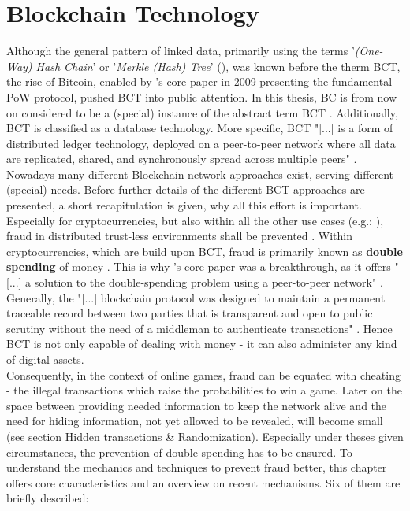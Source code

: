 
\chapter{Blockchain Technology}
\label{chap:BCT}

Although the general pattern of linked data,
primarily using the terms '\textit{(One-Way) Hash Chain}' or '\textit{Merkle (Hash) Tree}' (\citet{Hu.2005}),
was known before the therm \gls{BCT}, the rise of Bitcoin,
enabled by \citeauthor{Nakamoto.2009}'s core paper in 2009 presenting the fundamental \gls{PoW} protocol, pushed \gls{BCT} into public attention.
In this thesis, \gls{BC} is from now on considered to be a (special) instance of the abstract term \gls{BCT} \label{sec:BCI}.
Additionally, \gls{BCT} is classified as a database technology.
More specific, \gls{BCT} "[...] is a form of distributed ledger technology, deployed on a peer-to-peer network where all data are replicated, shared, and synchronously spread across multiple peers" \cite[13]{Butijn.2020}.
Nowadays many different Blockchain network approaches exist, serving different (special) needs.
Before further details of the different \gls{BCT} approaches are presented, a short recapitulation is given, why all this effort is important. \\
Especially for cryptocurrencies, but also within all the other use cases (e.g.: \cite{Serada.2020}),
fraud in distributed trust-less environments shall be prevented \cite[1]{Xu.2019}.
Within cryptocurrencies, which are build upon \gls{BCT}, fraud is primarily known as \textbf{double spending} of money \cite[1]{Nakamoto.2009}.
This is why \citet{Nakamoto.2009}'s core paper was a breakthrough, as it offers "[...] a solution to the double-spending problem using a peer-to-peer network" \cite[1]{Nakamoto.2009}.
Generally, the "[...] blockchain protocol was designed to maintain a permanent traceable record between two parties that is transparent and
open to public scrutiny without the need of a middleman to authenticate transactions" \cite[483]{Gainsbury.2017}.
Hence \gls{BCT} is not only capable of dealing with money - it can also administer any kind of digital assets. \\
Consequently, in the context of online games, fraud 
can be equated with cheating - the illegal transactions which raise the probabilities to win a game.
Later on the space between providing needed information to keep the network alive and the need for hiding information,
not yet allowed to be revealed, will become small (see section \hyperref[sec:HiddenTransactionsPlusRandomization]{Hidden transactions \& Randomization}).
Especially under theses given circumstances, the prevention of double spending has to be ensured.
To understand the mechanics and techniques to prevent fraud better, this chapter offers core characteristics and an overview on recent mechanisms.
Six of them are briefly described:


